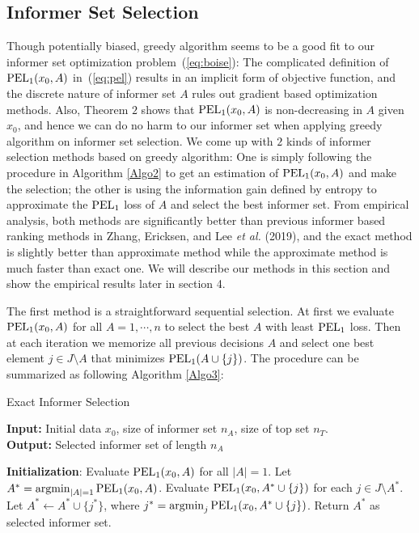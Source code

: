 \documentclass[12pt]{article}
\DeclareMathOperator*{\argmin}{argmin}
\begin{document}
\subsection{Informer Set Selection}
Though potentially biased, greedy algorithm seems to be a good fit to our informer set optimization problem~(\ref{eq:boise}): The complicated definition of ${\rm PEL}_1(x_0,A)$ in~(\ref{eq:pel}) results in an implicit form of objective function, and the discrete nature of informer set $A$ rules out gradient based optimization methods. Also, Theorem $2$ shows that ${\rm PEL}_1(x_0,A)$ is non-decreasing in $A$ given $x_0$, and hence we can do no harm to our informer set when applying greedy algorithm on informer set selection. We come up with $2$ kinds of informer selection methods based on greedy algorithm: One is simply following the procedure in Algorithm \ref{Algo2} to get an estimation of ${\rm PEL}_1(x_0,A)$ and make the selection; the other is using the information gain defined by entropy to approximate the ${\rm PEL}_1$ loss of $A$ and select the best informer set. From empirical analysis, both methods are significantly better than previous informer based ranking methods in Zhang, Ericksen, and Lee {\em et al.} (2019), and the exact method is slightly better than approximate method while the approximate method is much faster than exact one. We will describe our methods in this section and show the empirical results later in section 4.

The first method is a straightforward sequential selection. At first we evaluate ${\rm PEL}_1(x_0,A)$ for all $A=1,\cdots,n$ to select the best $A$ with least ${\rm PEL}_1$ loss. Then at each iteration we memorize all previous decisions $A$ and select one best element $j\in J\setminus A$ that minimizes ${\rm PEL}_1(A\cup \{j\})$. The procedure can be summarized as following Algorithm \ref{Algo3}:
\begin{algorithm}
\caption{Exact Informer Selection}\label{Algo3}
\hspace*{\algorithmicindent} \textbf{Input:} Initial data $x_0$, size of informer set $n_A$, size of top set $n_T$.\\
\hspace*{\algorithmicindent} \textbf{Output:} Selected informer set of length $n_A$
\begin{algorithmic}[1]
\State \textbf{Initialization}: Evaluate ${\rm PEL}_1(x_0,A)$ for all $|A|=1$. Let $A^* = \argmin_{|A|=1}{\rm PEL}_1(x_0,A) $.
    \State Evaluate ${\rm PEL}_1(x_0,A^*\cup\{j\})$ for each $j\in J\setminus A^*$.
    \State Let $A^* \gets A^*\cup\{j^*\}$, where $j^* = \argmin_{j}{\rm PEL}_1(x_0,A^*\cup\{j\})$.
\EndWhile
\State Return $A^*$ as selected informer set.
\end{algorithmic}
\end{algorithm}
\end{document}
